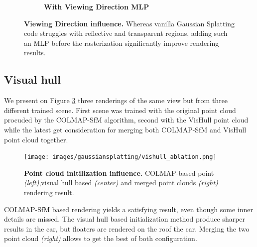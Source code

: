 \begin{figure}[htb!]
\begin{subfigure}[b]{0.48\linewidth}
    \caption{\textbf{With Viewing Direction MLP}}
    \label{fig:gs-view3-gs}
  \end{subfigure}
  \caption{\textbf{Viewing Direction influence.} Whereas vanilla Gaussian Splatting code struggles with reflective and transparent regions, adding such an MLP before the rasterization significantly improve rendering results. }
  \label{fig:gs-vh}
\end{figure}



\subsection{Visual hull} 

We present on Figure \ref{fig:gs-vishull-comp} three renderings of the same view but from three different trained scene. First scene was trained with the original point cloud procuded by the COLMAP-SfM algorithm, second with the VisHull point cloud while the latest get consideration for merging both COLMAP-SfM and VisHull point cloud together.   



\begin{figure}[htb!]
  \center
\texttt{[image: images/gaussiansplatting/vishull\_ablation.png]}
\caption{\textbf{Point cloud initilization influence.} COLMAP-based point \textit{(left)},visual hull based \textit{(center)} and merged point clouds \textit{(right)}  rendering result.}
\label{fig:gs-vishull-comp}
\end{figure}


COLMAP-SfM based rendering yields a satisfying result, even though some inner details are missed. The visual hull based initialization method produce sharper results in the car, but floaters are rendered on the roof the car. Merging the two point cloud \textit{(right)} allows to get the best of both configuration. 

